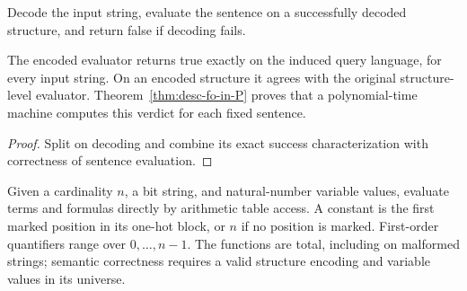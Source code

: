 \begin{definition}
  \label{def:desc-encoded-model-checking}
  \leanok
  Decode the input string, evaluate the sentence on a successfully decoded
  structure, and return false if decoding fails.
\end{definition}

\begin{theorem}
  \label{thm:desc-encoded-model-checking}
  \leanok
  The encoded evaluator returns true exactly on the induced query language,
  for every input string. On an encoded structure it agrees with the original
  structure-level evaluator. Theorem~\ref{thm:desc-fo-in-P} proves that a
  polynomial-time machine computes this verdict for each fixed sentence.
\end{theorem}
\begin{proof}
  \leanok
  Split on decoding and combine its exact success characterization with
  correctness of sentence evaluation.
\end{proof}

\begin{definition}
  \label{def:desc-arithmetic-model-checking}
  \leanok
  Given a cardinality $n$, a bit string, and natural-number variable values,
  evaluate terms and formulas directly by arithmetic table access. A constant
  is the first marked position in its one-hot block, or $n$ if no position is
  marked. First-order quantifiers range over $0,\ldots,n-1$. The functions are
  total, including on malformed strings; semantic correctness requires a valid
  structure encoding and variable values in its universe.
\end{definition}

